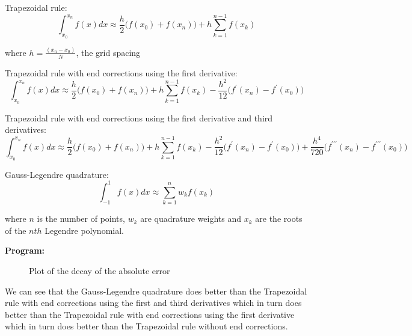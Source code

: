 \documentclass[a4paper,11pt]{report}
\begin{document}
\begin{enumerate}
    Trapezoidal rule:
    \begin{equation*}
    \int_{x_{0}}^{x_{n}} f(x) dx \approx \frac{h}{2} \Big(f(x_{0}) + f(x_{n}) \Big) + h \sum_{k=1}^{n-1} f(x_{k})
    \end{equation*}

    where $h = \displaystyle \frac{(x_{n} - x_{0})}{N}$, the grid spacing

    Trapezoidal rule with end corrections using the first derivative:
    \begin{equation*}
    \int_{x_{0}}^{x_{n}} f(x) dx \approx \frac{h}{2} \Big(f(x_{0}) + f(x_{n}) \Big) + h \sum_{k=1}^{n-1} f(x_{k}) - \frac{h^{2}}{12} \Big(f^{\prime}(x_{n}) - f^{\prime}(x_{0}) \Big)
    \end{equation*}

    Trapezoidal rule with end corrections using the first derivative and third derivatives:
    \begin{equation*}
    \int_{x_{0}}^{x_{n}} f(x) dx \approx \frac{h}{2} \Big(f(x_{0}) + f(x_{n}) \Big) + h \sum_{k=1}^{n-1} f(x_{k}) - \frac{h^{2}}{12} \Big(f^{\prime}(x_{n}) - f^{\prime}(x_{0}) \Big) + \frac{h^{4}}{720} \Big(f^{\prime\prime\prime}(x_{n}) - f^{\prime\prime\prime}(x_{0}) \Big)
    \end{equation*}

    Gauss-Legendre quadrature:
    \begin{equation*}
    \int_{-1}^{1} f(x) dx \approx \sum_{k=1}^{n} w_{k} f(x_{k})
    \end{equation*}

    where $n$ is the number of points, $w_{k}$ are quadrature weights and $x_{k}$ are the roots of the $nth$ Legendre polynomial. 
            
    \pagebreak

    \textbf{Program:}
    

    \begin{figure}[ht!]
    \centering
    \resizebox{0.95\linewidth}{!}{}
    \caption{Plot of the decay of the absolute error}
    \end{figure}

    

    We can see that the Gauss-Legendre quadrature does better than the Trapezoidal rule with end corrections using the first and 
    third derivatives which in turn does better than the Trapezoidal rule with end corrections using the first derivative which 
    in turn does better than the Trapezoidal rule without end corrections.


\end{enumerate}
\end{document}
